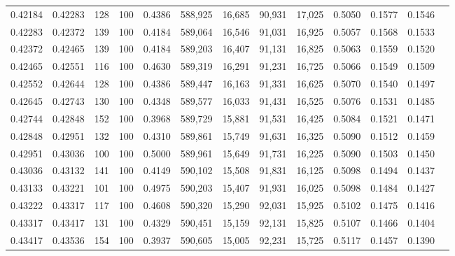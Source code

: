 \begin{tabular}{rrrrrrrrrrrrr}
0.42184 & 0.42283 &   128 & 100 &                                     0.4386 & 588,925 &  16,685 &  90,931 &  17,025 & 0.5050 & 0.1577 & 0.1546 \\
0.42283 & 0.42372 &   139 & 100 &                                     0.4184 & 589,064 &  16,546 &  91,031 &  16,925 & 0.5057 & 0.1568 & 0.1533 \\
0.42372 & 0.42465 &   139 & 100 &                                     0.4184 & 589,203 &  16,407 &  91,131 &  16,825 & 0.5063 & 0.1559 & 0.1520 \\
0.42465 & 0.42551 &   116 & 100 &                                     0.4630 & 589,319 &  16,291 &  91,231 &  16,725 & 0.5066 & 0.1549 & 0.1509 \\
0.42552 & 0.42644 &   128 & 100 &                                     0.4386 & 589,447 &  16,163 &  91,331 &  16,625 & 0.5070 & 0.1540 & 0.1497 \\
0.42645 & 0.42743 &   130 & 100 &                                     0.4348 & 589,577 &  16,033 &  91,431 &  16,525 & 0.5076 & 0.1531 & 0.1485 \\
0.42744 & 0.42848 &   152 & 100 &                                     0.3968 & 589,729 &  15,881 &  91,531 &  16,425 & 0.5084 & 0.1521 & 0.1471 \\
0.42848 & 0.42951 &   132 & 100 &                                     0.4310 & 589,861 &  15,749 &  91,631 &  16,325 & 0.5090 & 0.1512 & 0.1459 \\
0.42951 & 0.43036 &   100 & 100 &                                     0.5000 & 589,961 &  15,649 &  91,731 &  16,225 & 0.5090 & 0.1503 & 0.1450 \\
0.43036 & 0.43132 &   141 & 100 &                                     0.4149 & 590,102 &  15,508 &  91,831 &  16,125 & 0.5098 & 0.1494 & 0.1437 \\
0.43133 & 0.43221 &   101 & 100 &                                     0.4975 & 590,203 &  15,407 &  91,931 &  16,025 & 0.5098 & 0.1484 & 0.1427 \\
0.43222 & 0.43317 &   117 & 100 &                                     0.4608 & 590,320 &  15,290 &  92,031 &  15,925 & 0.5102 & 0.1475 & 0.1416 \\
0.43317 & 0.43417 &   131 & 100 &                                     0.4329 & 590,451 &  15,159 &  92,131 &  15,825 & 0.5107 & 0.1466 & 0.1404 \\
0.43417 & 0.43536 &   154 & 100 &                                     0.3937 & 590,605 &  15,005 &  92,231 &  15,725 & 0.5117 & 0.1457 & 0.1390 \\

\end{tabular}
